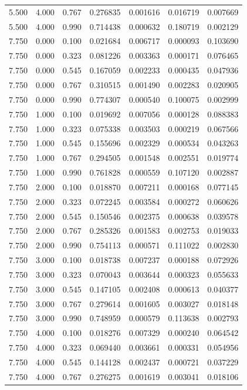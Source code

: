 \documentclass{article}
\begin{document}
\begin{longtable}{ccccccc}
    5.500& 4.000& 0.767&0.276835&0.001616&0.016719&0.007669\\
    5.500& 4.000& 0.990&0.714438&0.000632&0.180719&0.002129\\
    7.750& 0.000& 0.100&0.021684&0.006717&0.000093&0.103690\\
    7.750& 0.000& 0.323&0.081226&0.003363&0.000171&0.076465\\
    7.750& 0.000& 0.545&0.167059&0.002233&0.000435&0.047936\\
    7.750& 0.000& 0.767&0.310515&0.001490&0.002283&0.020905\\
    7.750& 0.000& 0.990&0.774307&0.000540&0.100075&0.002999\\
    7.750& 1.000& 0.100&0.019692&0.007056&0.000128&0.088383\\
    7.750& 1.000& 0.323&0.075338&0.003503&0.000219&0.067566\\
    7.750& 1.000& 0.545&0.155696&0.002329&0.000534&0.043263\\
    7.750& 1.000& 0.767&0.294505&0.001548&0.002551&0.019774\\
    7.750& 1.000& 0.990&0.761828&0.000559&0.107120&0.002887\\
    7.750& 2.000& 0.100&0.018870&0.007211&0.000168&0.077145\\
    7.750& 2.000& 0.323&0.072245&0.003584&0.000272&0.060626\\
    7.750& 2.000& 0.545&0.150546&0.002375&0.000638&0.039578\\
    7.750& 2.000& 0.767&0.285326&0.001583&0.002753&0.019033\\
    7.750& 2.000& 0.990&0.754113&0.000571&0.111022&0.002830\\
    7.750& 3.000& 0.100&0.018738&0.007237&0.000188&0.072926\\
    7.750& 3.000& 0.323&0.070043&0.003644&0.000323&0.055633\\
    7.750& 3.000& 0.545&0.147105&0.002408&0.000613&0.040377\\
    7.750& 3.000& 0.767&0.279614&0.001605&0.003027&0.018148\\
    7.750& 3.000& 0.990&0.748959&0.000579&0.113638&0.002793\\
    7.750& 4.000& 0.100&0.018276&0.007329&0.000240&0.064542\\
    7.750& 4.000& 0.323&0.069440&0.003661&0.000331&0.054956\\
    7.750& 4.000& 0.545&0.144128&0.002437&0.000721&0.037229\\
    7.750& 4.000& 0.767&0.276275&0.001619&0.003041&0.018106\\

\end{longtable}
\end{document}
